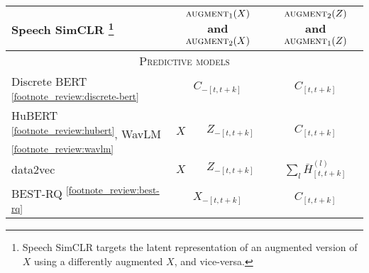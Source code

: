 \begin{table}[h!]
{\begin{tabular}{l|c|c|c}
    \midrule
    Speech SimCLR \parencite{jiang_speech_2021}\footnote{Speech SimCLR targets the latent representation of an augmented version of $X$ using a differently augmented $X$, and vice-versa.}    & \multicolumn{2}{c|}{$\textsc{augment}_1(X)$ and $\textsc{augment}_2(X)$}     &    $\textsc{augment}_2(Z)$ and $\textsc{augment}_1(Z)$   \\ 
    \midrule
    \midrule 
    \multicolumn{4}{c}{\textsc{Predictive models}} \\
    \midrule
    \midrule
    Discrete BERT~\parencite{baevski_vqwav2vec_2020,baevski_effectiveness_2020} \textsuperscript{\ref{footnote_review:discrete-bert}}      &   \multicolumn{2}{c|}{$C_{-[t,t+k]}$}   & $C_{[t,t+k]}$  \\
    \midrule 
    HuBERT \parencite{hsu_hubert_2021}\textsuperscript{\ref{footnote_review:hubert}}, WavLM \parencite{chen_wavlm_2021}\textsuperscript{\ref{footnote_review:wavlm}}  & $X$             & $Z_{-[t,t+k]}$          & $C_{[t,t+k]}$  \\ 
    \midrule
    data2vec \parencite{baevski_data2vec_2022}    & $X$             & $Z_{-[t,t+k]}$          & $\sum_{l}\bar{H}^{(l)}_{[t,t+k]}$  \\ 
    \midrule 
    BEST-RQ \parencite{chiu_selfsupervised_2022}\textsuperscript{\ref{footnote_review:best-rq}}    &  \multicolumn{2}{c|}{$X_{-[t,t+k]}$}      &  $C_{[t,t+k]}$   \\ 
    \midrule 
    \bottomrule
\end{tabular}
}
    
\label{table:pretext}
\end{table}


